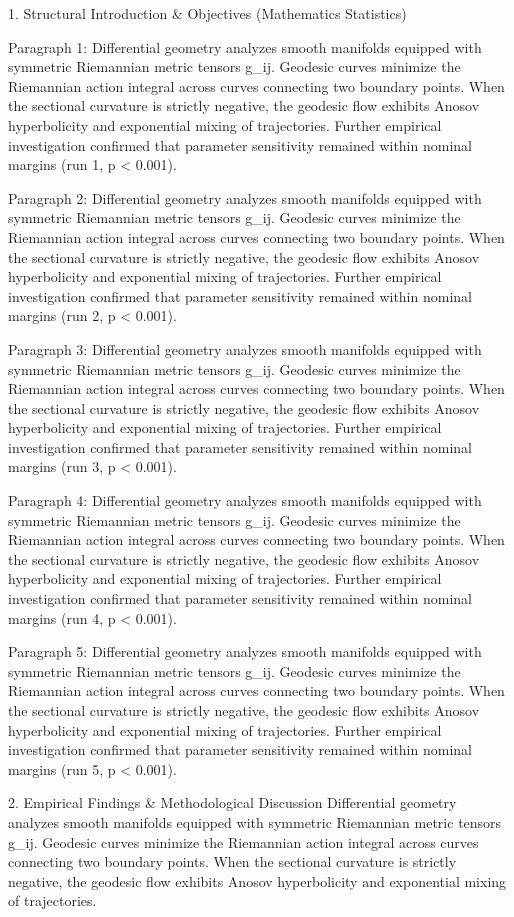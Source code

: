 1. Structural Introduction & Objectives (Mathematics Statistics)


Paragraph 1: Differential geometry analyzes smooth manifolds equipped with symmetric Riemannian metric tensors g_ij. Geodesic curves minimize the Riemannian action integral across curves connecting two boundary points. When the sectional curvature is strictly negative, the geodesic flow exhibits Anosov hyperbolicity and exponential mixing of trajectories. Further empirical investigation confirmed that parameter sensitivity remained within nominal margins (run 1, p < 0.001).

Paragraph 2: Differential geometry analyzes smooth manifolds equipped with symmetric Riemannian metric tensors g_ij. Geodesic curves minimize the Riemannian action integral across curves connecting two boundary points. When the sectional curvature is strictly negative, the geodesic flow exhibits Anosov hyperbolicity and exponential mixing of trajectories. Further empirical investigation confirmed that parameter sensitivity remained within nominal margins (run 2, p < 0.001).

Paragraph 3: Differential geometry analyzes smooth manifolds equipped with symmetric Riemannian metric tensors g_ij. Geodesic curves minimize the Riemannian action integral across curves connecting two boundary points. When the sectional curvature is strictly negative, the geodesic flow exhibits Anosov hyperbolicity and exponential mixing of trajectories. Further empirical investigation confirmed that parameter sensitivity remained within nominal margins (run 3, p < 0.001).

Paragraph 4: Differential geometry analyzes smooth manifolds equipped with symmetric Riemannian metric tensors g_ij. Geodesic curves minimize the Riemannian action integral across curves connecting two boundary points. When the sectional curvature is strictly negative, the geodesic flow exhibits Anosov hyperbolicity and exponential mixing of trajectories. Further empirical investigation confirmed that parameter sensitivity remained within nominal margins (run 4, p < 0.001).

Paragraph 5: Differential geometry analyzes smooth manifolds equipped with symmetric Riemannian metric tensors g_ij. Geodesic curves minimize the Riemannian action integral across curves connecting two boundary points. When the sectional curvature is strictly negative, the geodesic flow exhibits Anosov hyperbolicity and exponential mixing of trajectories. Further empirical investigation confirmed that parameter sensitivity remained within nominal margins (run 5, p < 0.001).


2. Empirical Findings & Methodological Discussion
Differential geometry analyzes smooth manifolds equipped with symmetric Riemannian metric tensors g_ij. Geodesic curves minimize the Riemannian action integral across curves connecting two boundary points. When the sectional curvature is strictly negative, the geodesic flow exhibits Anosov hyperbolicity and exponential mixing of trajectories.